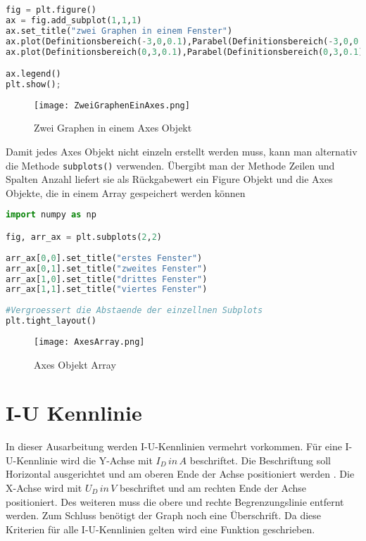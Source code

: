 \begin{lstlisting}[caption= Zwei Graphen in einem Axes Objekt, label=lst:ZweiGraphenEinAxes,language=Python] 
fig = plt.figure()
ax = fig.add_subplot(1,1,1)
ax.set_title("zwei Graphen in einem Fenster")
ax.plot(Definitionsbereich(-3,0,0.1),Parabel(Definitionsbereich(-3,0,0.1)),'g:',label = 'links')
ax.plot(Definitionsbereich(0,3,0.1),Parabel(Definitionsbereich(0,3,0.1)),'r--',label = 'rechts')

ax.legend()
plt.show();
\end{lstlisting}

\begin{figure}[!htb]
\centering
\texttt{[image: ZweiGraphenEinAxes.png]}
\caption{Zwei Graphen in einem Axes Objekt}
\label{img:ZweiGraphenEinAxes}
\end{figure}


Damit jedes Axes Objekt nicht einzeln erstellt werden muss, kann man alternativ die Methode \texttt{subplots()} verwenden.
Übergibt man der Methode Zeilen und Spalten Anzahl liefert sie als Rückgabewert ein Figure Objekt und die Axes Objekte, die in einem Array gespeichert werden können

\begin{lstlisting}[caption= Axes Objekt Array, label=lst:AxesArray,language=Python] 
import numpy as np

fig, arr_ax = plt.subplots(2,2)
        
arr_ax[0,0].set_title("erstes Fenster")
arr_ax[0,1].set_title("zweites Fenster")
arr_ax[1,0].set_title("drittes Fenster")
arr_ax[1,1].set_title("viertes Fenster")
        
#Vergroessert die Abstaende der einzellnen Subplots    
plt.tight_layout()
\end{lstlisting}

\begin{figure}[!htb]
\centering
\texttt{[image: AxesArray.png]}
\caption{Axes Objekt Array}
\label{img:AxesArray}
\end{figure}


\section{I-U Kennlinie} \label{sec: IUKennlinie}

In dieser Ausarbeitung werden I-U-Kennlinien vermehrt vorkommen. Für eine I-U-Kennlinie wird die Y-Achse mit  $I_{D}\, in\, A $  beschriftet. Die Beschriftung soll Horizontal ausgerichtet und am oberen Ende der Achse  positioniert werden . Die X-Achse wird mit $U_{D}\,  in\, V$ beschriftet und am rechten Ende der Achse positioniert. Des weiteren muss die obere und rechte  Begrenzungslinie entfernt werden. Zum Schluss benötigt der Graph noch eine Überschrift. Da diese Kriterien für alle I-U-Kennlinien gelten wird eine Funktion geschrieben. 

